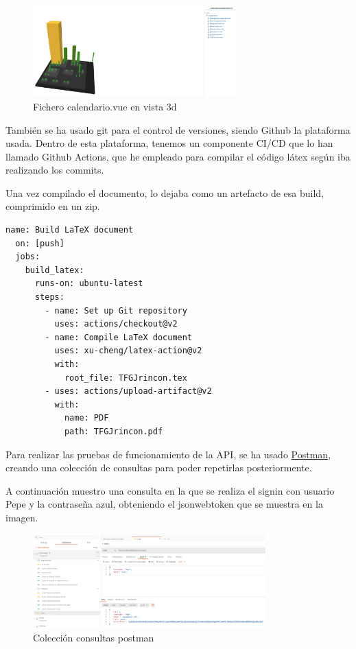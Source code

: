 \documentclass[11pt,spanish,listoffigures,listoftables]{tfgetsinf}
\begin{document}
\begin{figure}[h!] %
  \centering
   \includegraphics[width=0.70\textwidth]{img/calendarioSonarqube.png}
   \caption{Fichero calendario.vue en vista 3d}
   \label{fig:calendariosonar}
 \end{figure}

También se ha usado git para el control de versiones, siendo Github la plataforma usada. Dentro de esta plataforma, tenemos un componente CI/CD que lo han llamado Github Actions, que he empleado para compilar el código látex según iba realizando los commits.

Una vez compilado el documento, lo dejaba como un artefacto de esa build, comprimido en un zip. 

\begin{lstlisting}[style=ES6, caption={Configuración action github}]
  name: Build LaTeX document
  on: [push]
  jobs:
    build_latex:
      runs-on: ubuntu-latest
      steps:
        - name: Set up Git repository
          uses: actions/checkout@v2
        - name: Compile LaTeX document
          uses: xu-cheng/latex-action@v2
          with:
            root_file: TFGJrincon.tex
        - uses: actions/upload-artifact@v2
          with:
            name: PDF
            path: TFGJrincon.pdf
\end{lstlisting}
\clearpage
Para realizar las pruebas de funcionamiento de la API, se ha usado \href{https://www.postman.com/}{Postman}, creando una colección de consultas para poder repetirlas posteriormente.

A continuación muestro una consulta en la que se realiza el signin con usuario Pepe y la contraseña azul, obteniendo el jsonwebtoken que se muestra en la imagen.

\begin{figure}[h!] %
  \centering
   \includegraphics[width=0.80\textwidth]{img/postman.png}
   \caption{Colección consultas postman}
   \label{fig:postman}
 \end{figure}
\end{document}

